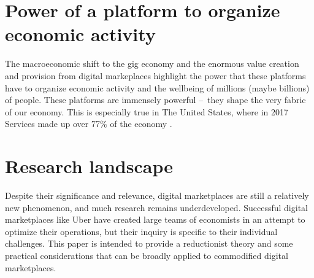 \section{Power of a platform to organize economic activity}
The macroeconomic shift to the gig economy and the enormous value creation and provision from digital markeplaces highlight the power that these platforms have to organize economic activity and the wellbeing of millions (maybe billions) of people. These platforms are immensely powerful – they shape the very fabric of our economy. This is especially true in The United States, where in 2017 Services made up over 77\% of the economy \citep{economyDistribution}.

\section{Research landscape}
Despite their significance and relevance, digital marketplaces are still a relatively new phenomenon, and much research remains underdeveloped. Successful digital marketplaces like Uber have created large teams of economists in an attempt to optimize their operations, but their inquiry is specific to their individual challenges. This paper is intended to provide a reductionist theory and some practical considerations that can be broadly applied to commodified digital marketplaces.